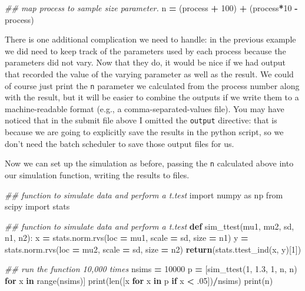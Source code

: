 \documentclass[]{book}
\newenvironment{Shaded}{\begin{snugshade}}{\end{snugshade}}
\newcommand{\KeywordTok}[1]{\textcolor[rgb]{0.13,0.29,0.53}{\textbf{#1}}}
\newcommand{\DecValTok}[1]{\textcolor[rgb]{0.00,0.00,0.81}{#1}}
\newcommand{\FloatTok}[1]{\textcolor[rgb]{0.00,0.00,0.81}{#1}}
\newcommand{\ImportTok}[1]{#1}
\newcommand{\CommentTok}[1]{\textcolor[rgb]{0.56,0.35,0.01}{\textit{#1}}}
\newcommand{\ControlFlowTok}[1]{\textcolor[rgb]{0.13,0.29,0.53}{\textbf{#1}}}
\newcommand{\OperatorTok}[1]{\textcolor[rgb]{0.81,0.36,0.00}{\textbf{#1}}}
\newcommand{\BuiltInTok}[1]{#1}
\newcommand{\NormalTok}[1]{#1}
\begin{document}
\begin{enumerate}
\begin{Shaded}
\begin{Highlighting}[]
\CommentTok{## map process to sample size parameter.}
\NormalTok{n }\OperatorTok{=}\NormalTok{ (process }\OperatorTok{+} \DecValTok{100}\NormalTok{) }\OperatorTok{+}\NormalTok{ (process}\OperatorTok{*}\DecValTok{10} \OperatorTok{-}\NormalTok{ process)}
\end{Highlighting}
\end{Shaded}

  There is one additional complication we need to handle: in the
  previous example we did need to keep track of the parameters used by
  each process because the parameters did not vary. Now that they do, it
  would be nice if we had output that recorded the value of the varying
  parameter as well as the result. We could of course just print the
  \texttt{n} parameter we calculated from the process number along with
  the result, but it will be easier to combine the outputs if we write
  them to a machine-readable format (e.g., a comma-separated-values
  file). You may have noticed that in the submit file above I omitted
  the \texttt{output} directive: that is because we are going to
  explicitly save the results in the python script, so we don't need the
  batch scheduler to save those output files for us.

  Now we can set up the simulation as before, passing the \texttt{n}
  calculated above into our simulation function, writing the results to
  files.

\begin{Shaded}
\begin{Highlighting}[]
\CommentTok{## function to simulate data and perform a t.test}
\ImportTok{import}\NormalTok{ numpy }\ImportTok{as}\NormalTok{ np}
\ImportTok{from}\NormalTok{ scipy }\ImportTok{import}\NormalTok{ stats}

\CommentTok{## function to simulate data and perform a t.test}
\KeywordTok{def}\NormalTok{ sim_ttest(mu1, mu2, sd, n1, n2):}
\NormalTok{    x }\OperatorTok{=}\NormalTok{ stats.norm.rvs(loc }\OperatorTok{=}\NormalTok{ mu1, scale }\OperatorTok{=}\NormalTok{ sd, size }\OperatorTok{=}\NormalTok{ n1)}
\NormalTok{    y }\OperatorTok{=}\NormalTok{ stats.norm.rvs(loc }\OperatorTok{=}\NormalTok{ mu2, scale }\OperatorTok{=}\NormalTok{ sd, size }\OperatorTok{=}\NormalTok{ n2)}
    \ControlFlowTok{return}\NormalTok{(stats.ttest_ind(x, y)[}\DecValTok{1}\NormalTok{])}

\CommentTok{##  run the function 10,000 times}
\NormalTok{nsims }\OperatorTok{=} \DecValTok{10000}
\NormalTok{p }\OperatorTok{=}\NormalTok{ [sim_ttest(}\DecValTok{1}\NormalTok{, }\FloatTok{1.3}\NormalTok{, }\DecValTok{1}\NormalTok{, n, n)  }\ControlFlowTok{for}\NormalTok{ x }\KeywordTok{in} \BuiltInTok{range}\NormalTok{(nsims)]}
\BuiltInTok{print}\NormalTok{(}\BuiltInTok{len}\NormalTok{([x }\ControlFlowTok{for}\NormalTok{ x }\KeywordTok{in}\NormalTok{ p }\ControlFlowTok{if}\NormalTok{ x }\OperatorTok{<}\NormalTok{ .}\DecValTok{05}\NormalTok{])}\OperatorTok{/}\NormalTok{nsims)}
\BuiltInTok{print}\NormalTok{(n)}
\end{Highlighting}
\end{Shaded}


\end{enumerate}
\end{document}
